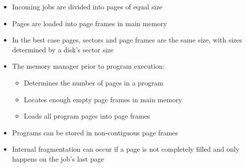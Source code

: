 \documentclass[12pt letter]{report}
\begin{document}

\begin{itemize}
  \item Incoming jobs are divided into pages of equal size
  \item Pages are loaded into page frames in main memory
  \item In the best case pages, sectors and page frames are the same size, with sizes determined by a disk's sector size
  \item The memory manager prior to program execution:
        \begin{itemize}
          \item Determines the number of pages in a program
          \item Locates enough empty page frames in main memory
          \item Loads all program pages into page frames
        \end{itemize}
  \item Programs can be stored in non-contiguous page frames
  \item Internal fragmentation can occur if a page is not completely filled and only happens on the job's last page
\end{itemize}
\end{document}
